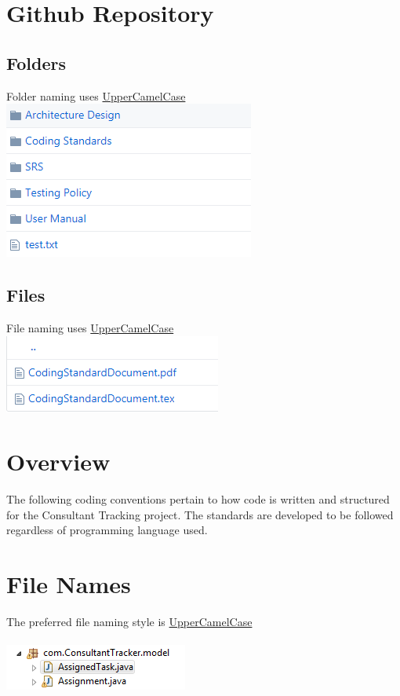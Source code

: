 \documentclass[a4paper,12pt]{report}
\begin{document}
\section{Github Repository}
\subsection{Folders} 
Folder naming uses \underline{UpperCamelCase} \\
\includegraphics{Github}
\subsection{Files} 
File naming uses \underline{UpperCamelCase} \\
\includegraphics{fileNaming}

\section{Overview}
The following coding conventions pertain to how code is written and structured for the Consultant Tracking project. The standards are developed to be followed regardless of programming language used.

\section{File Names}
The preferred file naming style is \underline{UpperCamelCase} \\ \\
\includegraphics{Files}
\end{document}
